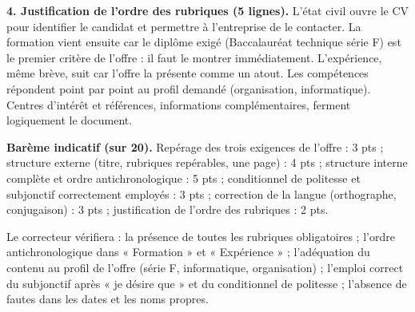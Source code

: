 \documentclass[11pt]{article}
\begin{document}
\begin{corrige}
\textbf{4. Justification de l'ordre des rubriques (5 lignes).} L'état civil ouvre le CV pour identifier le candidat et permettre à l'entreprise de le contacter. La formation vient ensuite car le diplôme exigé (Baccalauréat technique série F) est le premier critère de l'offre : il faut le montrer immédiatement. L'expérience, même brève, suit car l'offre la présente comme un atout. Les compétences répondent point par point au profil demandé (organisation, informatique). Centres d'intérêt et références, informations complémentaires, ferment logiquement le document.

\textbf{Barème indicatif (sur 20).} Repérage des trois exigences de l'offre : 3 pts ; structure externe (titre, rubriques repérables, une page) : 4 pts ; structure interne complète et ordre antichronologique : 5 pts ; conditionnel de politesse et subjonctif correctement employés : 3 pts ; correction de la langue (orthographe, conjugaison) : 3 pts ; justification de l'ordre des rubriques : 2 pts.
\end{corrige}

\begin{attention}
Le correcteur vérifiera : la présence de toutes les rubriques obligatoires ; l'ordre antichronologique dans « Formation » et « Expérience » ; l'adéquation du contenu au profil de l'offre (série F, informatique, organisation) ; l'emploi correct du subjonctif après « je désire que » et du conditionnel de politesse ; l'absence de fautes dans les dates et les noms propres.
\end{attention}
\end{document}
